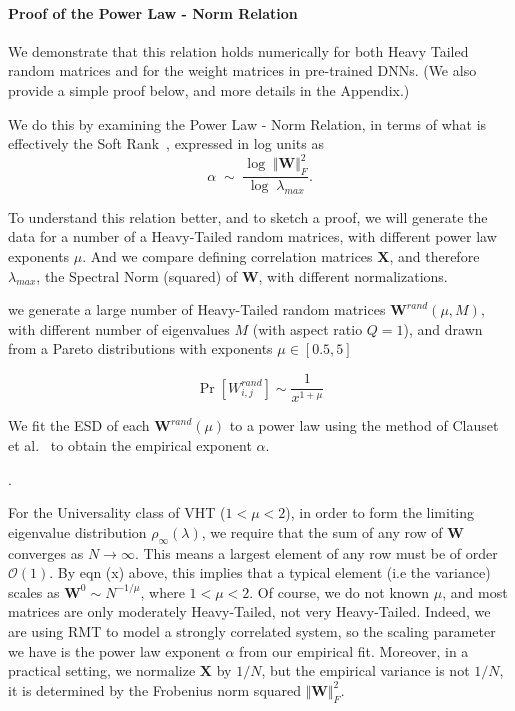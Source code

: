 \paragraph{Proof of the Power Law - Norm Relation}
We demonstrate that this relation holds numerically for both Heavy Tailed random matrices and for the weight matrices in pre-trained DNNs. 
(We also provide a simple proof below, and more details in the Appendix.)

We do this by examining  the Power Law - Norm Relation, in terms of what is effectively the Soft Rank~\cite{MM18_TR}, expressed in log units as 
$$
\alpha\;\sim\;\dfrac{\log\;\Vert\mathbf{W}\Vert^{2}_{F}}{\log\;\lambda_{max}}   .
$$

To understand this relation better, and to sketch a proof,
we will generate the data for a number of a Heavy-Tailed random matrices, 
with different power law exponents $\mu$.
And we compare defining correlation matrices $\mathbf{X}$, and therefore $\lambda_{max}$,
the Spectral Norm (squared) of $\mathbf{W}$, with different normalizations.

  we generate a large number of  Heavy-Tailed  random matrices $\mathbf{W}^{rand}(\mu,M)$, 
with different number of eigenvalues $M$ (with aspect ratio $Q=1$), 
and drawn from a Pareto distributions with exponents $\mu\in[0.5, 5]$

$$\Pr[{W}^{rand}_{i,j}]\sim\dfrac{1}{x^{1+\mu}}$$

We fit the ESD of each $\mathbf{W}^{rand}(\mu)$ to a power law using the method of Clauset et al.~\cite{CSN09_powerlaw,ABP14} to obtain the empirical exponent $\alpha$.  

.

For the Universality class of VHT ($1<\mu<2$), in order to form the limiting eigenvalue distribution $\rho_{\infty}(\lambda)$,
we require that the sum of any row of $\mathbf{W}$ converges as $N\rightarrow\infty$. This means a largest  element of any row
must be of order $\mathcal{O}(1)$.  By eqn (x) above, this implies that a typical element  (i.e the variance) scales as $\mathbf{W}^{0}\sim N^{-1/\mu}$, where $1<\mu<2$.
Of course, we do not known $\mu$, and most matrices are only moderately Heavy-Tailed, not very Heavy-Tailed.
Indeed, we are using RMT to model a strongly correlated system, so the scaling parameter
we have is the power law exponent $\alpha$ from our empirical fit.
Moreover, in a practical setting, we normalize $\mathbf{X}$ by $1/N$, but the empirical variance is not $1/N$, it is determined by the Frobenius norm squared
$\Vert\mathbf{W}\Vert^{2}_{F}$.   

